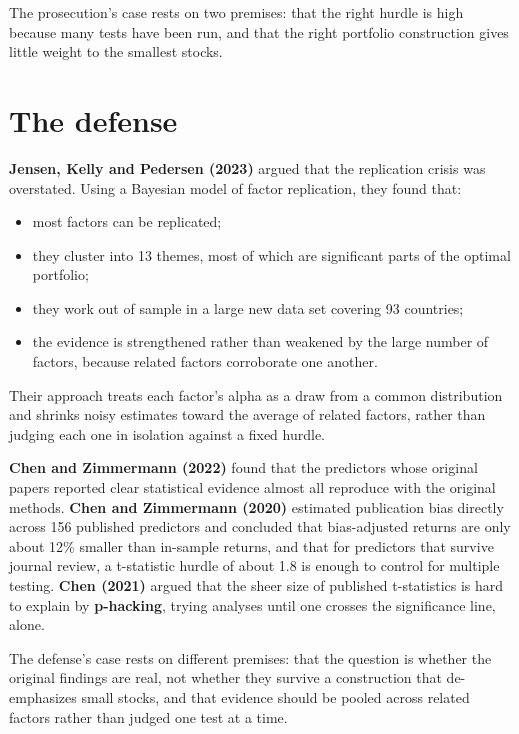 The prosecution's case rests on two premises: that the right hurdle is high because many tests have been run, and that the right portfolio construction gives little weight to the smallest stocks.

\section{The defense}
\label{sec:10-defense}

\textbf{Jensen, Kelly and Pedersen (2023)} argued that the replication crisis was overstated. Using a Bayesian model of factor replication, they found that:

\begin{itemize}
  \item most factors can be replicated;
  \item they cluster into 13 themes, most of which are significant parts of the optimal portfolio;
  \item they work out of sample in a large new data set covering 93 countries;
  \item the evidence is strengthened rather than weakened by the large number of factors, because related factors corroborate one another.
\end{itemize}

Their approach treats each factor's alpha as a draw from a common distribution and shrinks noisy estimates toward the average of related factors, rather than judging each one in isolation against a fixed hurdle.

\textbf{Chen and Zimmermann (2022)} found that the predictors whose original papers reported clear statistical evidence almost all reproduce with the original methods. \textbf{Chen and Zimmermann (2020)} estimated publication bias directly across 156 published predictors and concluded that bias-adjusted returns are only about 12\% smaller than in-sample returns, and that for predictors that survive journal review, a t-statistic hurdle of about 1.8 is enough to control for multiple testing. \textbf{Chen (2021)} argued that the sheer size of published t-statistics is hard to explain by \textbf{p-hacking}, trying analyses until one crosses the significance line, alone.

The defense's case rests on different premises: that the question is whether the original findings are real, not whether they survive a construction that de-emphasizes small stocks, and that evidence should be pooled across related factors rather than judged one test at a time.

